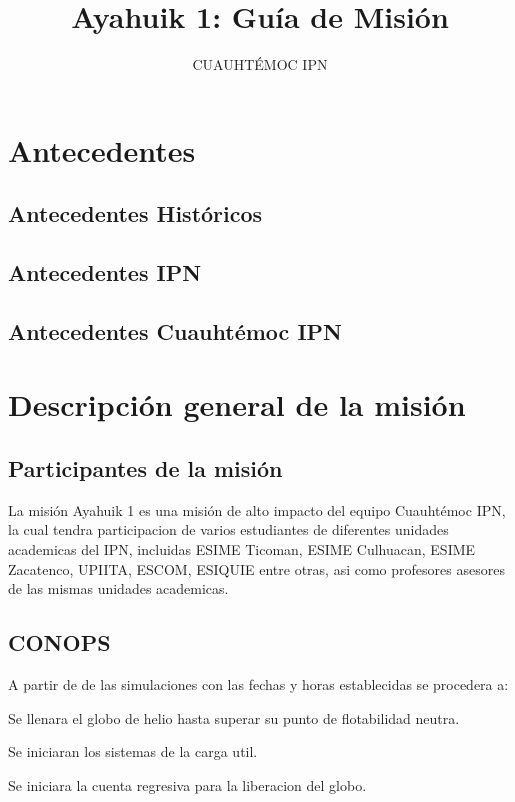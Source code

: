 \documentclass[letterpaper,12pt]{article} %
\title{Ayahuik 1: Guía de Misión}
\author{CUAUHTÉMOC IPN}
\begin{document}
\tableofcontents


\newpage
\section{Antecedentes}

    \subsection{Antecedentes Históricos}

    \subsection{Antecedentes IPN}

    \subsection{Antecedentes Cuauhtémoc IPN}

    \newpage

\section{Descripción general de la misión}

    \subsection{Participantes de la misión}

    La misión Ayahuik 1 es una misión de alto impacto del equipo Cuauhtémoc IPN, la cual tendra
    participacion de varios estudiantes de diferentes unidades academicas del IPN, incluidas ESIME Ticoman, 
    ESIME Culhuacan, ESIME Zacatenco, UPIITA, ESCOM, ESIQUIE entre otras, asi como profesores asesores de las mismas 
    unidades academicas.

    \subsection{CONOPS}

    A partir de de las simulaciones con las fechas y horas establecidas se procedera a:

    \medskip   \qquad Se llenara el globo de helio hasta superar su punto de flotabilidad neutra.

    \medskip   \qquad Se iniciaran los sistemas de la carga util.

    \medskip   \qquad Se iniciara la cuenta regresiva para la liberacion del globo.
    
\end{document}
